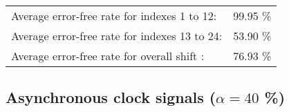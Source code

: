 \begin{table}[h]
\begin{center}
\begin{tabular}{|c|c|c|c|c|}
\end{tabular}


\flushleft
\begin{tabular}{l l}
Average error-free rate for indexes  1 to 12: &  99.95 \% \\
Average error-free rate for indexes 13 to 24: &  53.90 \% \\
Average error-free rate for overall shift   : &  76.93 \% \\

\end{tabular}


\end{center}
\end{table}


\pagebreak
\subsection{Asynchronous clock signals ($\alpha=40$ \%)}

